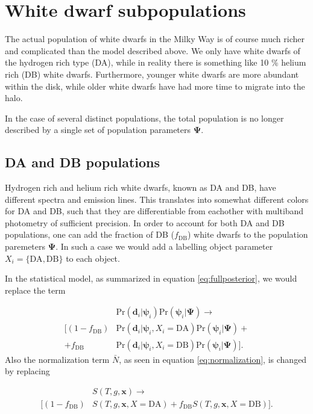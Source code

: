 \documentclass[fleqn,usenatbib]{mnras}
\newcommand{\popp}{\boldsymbol{\Psi}}
\newcommand{\objp}{\boldsymbol{\psi}}
\newcommand{\data}{\mathbf{d}}
\newcommand{\Teff}{T}
\newcommand{\logg}{g}
\newcommand{\pr}{\text{Pr}}
\begin{document}
\section{White dwarf subpopulations}

The actual population of white dwarfs in the Milky Way is of course much richer and complicated than the model described above. We only have white dwarfs of the hydrogen rich type (DA), while in reality there is something like 10 \% helium rich (DB) white dwarfs. Furthermore, younger white dwarfs are more abundant within the disk, while older white dwarfs have had more time to migrate into the halo.

In the case of several distinct populations, the total population is no longer described by a single set of population parameters $\popp$.






\subsection{DA and DB populations}

Hydrogen rich and helium rich white dwarfs, known as DA and DB, have different spectra and emission lines. This translates into somewhat different colors for DA and DB, such that they are differentiable from eachother with multiband photometry of sufficient precision. In order to account for both DA and DB populations, one can add the fraction of DB ($f_\text{DB}$) white dwarfs to the population paremeters $\popp$. In such a case we would add a labelling object parameter $X_i = \{\text{DA},\text{DB}\}$ to each object.

In the statistical model, as summarized in equation \eqref{eq:fullposterior}, we would replace the term

\begin{equation}
\begin{split}
	& \pr(\data_i | \objp_i) \pr(\objp_i | \popp)
	\rightarrow \\
	\Big[
	(1-f_\text{DB}) & \pr(\data_i | \objp_i,X_i=\text{DA}) \pr(\objp_i | \popp) + \\
	+ f_\text{DB} & \pr(\data_i | \objp_i,X_i=\text{DB}) \pr(\objp_i | \popp)
	\Big].
\end{split}
\end{equation}
Also the normalization term $\bar{N}$, as seen in equation \eqref{eq:normalization}, is changed by replacing

\begin{equation}
\begin{split}
	& S(\Teff,\logg,\mathbf{x}) \rightarrow \\
	\Big[
	 (1-f_\text{DB}) & S(\Teff,\logg,\mathbf{x},X=\text{DA})
	 + f_\text{DB} S(\Teff,\logg,\mathbf{x},X=\text{DB})
	 \Big].
\end{split}
\end{equation}
\end{document}
